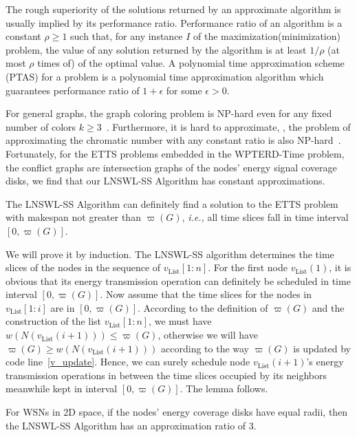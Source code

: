 \documentclass[journal,10pt]{IEEEtran}
\begin{document}
The rough superiority of the solutions returned by an approximate algorithm is usually implied by its performance ratio. Performance ratio of an algorithm is a constant $\rho{\geq}1$ such that, for any instance $I$ of the maximization(minimization) problem, the value of any solution returned by the algorithm is at least $1/{\rho}$ (at most $\rho$ times of) of the optimal value. A polynomial time approximation scheme (PTAS) for a problem is a polynomial time approximation algorithm which guarantees performance ratio of $1{+}\epsilon$ for some $\epsilon{>}0$.

For general graphs, the graph coloring problem is NP-hard even for any fixed number of colors $k{\geq}3$~\cite{Garey1979}. Furthermore, it is hard to approximate, , the problem of approximating the chromatic number with any constant ratio is also NP-hard~\cite{Arora1998}. Fortunately, for the ETTS problems embedded in the WPTERD-Time problem, the conflict graphs are intersection graphs of the nodes' energy signal coverage disks, we find that our LNSWL-SS Algorithm has constant approximations.

\begin{lemma}
\label{lemma_valid_solution}
The LNSWL-SS Algorithm can definitely find a solution to the ETTS problem with makespan not greater than $\varpi(G)$, \textit{i.e.,} all time slices fall in time interval $[0,\varpi(G)]$.
\end{lemma}

\begin{IEEEproof}
We will prove it by induction. The LNSWL-SS algorithm determines the time slices of the nodes in the sequence of $v_\text{List}[1{:}n]$. For the first node $v_\text{List}(1)$, it is obvious that its energy transmission operation can definitely be scheduled in time interval $[0,\varpi(G)]$. Now assume that the time slices for the nodes in $v_\text{List}[1{:}i]$ are in $[0,\varpi(G)]$. According to the definition of $\varpi(G)$ and the construction of the list $v_\text{List}[1{:}n]$, we must have $w(N(v_\text{List}(i{+}1))){\leq}\varpi(G)$, otherwise we will have $\varpi(G){\geq}w(N(v_\text{List}(i{+}1)))$ according to the way $\varpi(G)$ is updated by code line~\ref{v_update}. Hence, we can surely schedule node $v_\text{List}(i{+}1)$'s energy transmission operations in between the time slices occupied by its neighbors meanwhile kept in interval $[0,\varpi(G)]$. The lemma follows.
\end{IEEEproof}

\begin{lemma}
\label{lemma_2d_ratio3}
For WSNs in 2D space, if the nodes' energy coverage disks have equal radii, then the LNSWL-SS Algorithm has an approximation ratio of 3.
\end{lemma}
\end{document}
